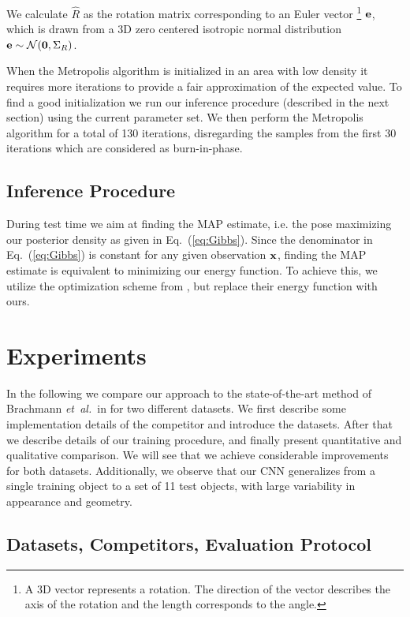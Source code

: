 \documentclass[10pt,letterpaper]{article}
\newcommand{\bx}{{\bf x}}
\newcommand{\etal}{\mbox{\emph{et al.\ }}}
\begin{document}
We calculate $\hat{R}$ as the rotation matrix corresponding to an Euler vector \footnote{A 3D vector  represents a rotation. The direction of the vector describes the axis of the rotation and the length corresponds to the angle.} ${\bf e}$, which is drawn from a 3D zero centered isotropic normal distribution ${\bf e} \sim \mathcal{N}({\bf 0},{ \Sigma}_R)$.

When the Metropolis algorithm is initialized in an area with low density it requires more iterations to provide a fair approximation of the expected value. To find a good initialization we run our inference procedure (described in the next section) using the current parameter set. We then perform the Metropolis algorithm for a total of 130 iterations, disregarding the samples from the first 30 iterations which are considered as burn-in-phase.  


\subsection{Inference Procedure \label{sec:inference}}
During test time we aim at finding the MAP estimate, i.e. the pose maximizing our posterior density as given in Eq.~(\ref{eq:Gibbs}). Since the denominator in Eq.~(\ref{eq:Gibbs}) is constant for any given observation $\bx$, finding the MAP estimate is equivalent to minimizing our energy function. To achieve this, we utilize the optimization scheme from \cite{brachmann2014}, but replace their energy function with ours. 



\section{Experiments}
\label{sec:exp}

In the following we compare our approach to the state-of-the-art method of Brachmann \etal in \cite{brachmann2014} for two different datasets. We first describe some implementation details of the competitor and introduce the datasets. After that we describe details of our training procedure, and finally present quantitative and qualitative  comparison. We will see that we achieve considerable improvements for both datasets. Additionally, we observe that our CNN generalizes from a single training object to a set of 11 test objects, with large variability in appearance and geometry.  


\subsection{Datasets, Competitors, Evaluation Protocol}
\end{document}
